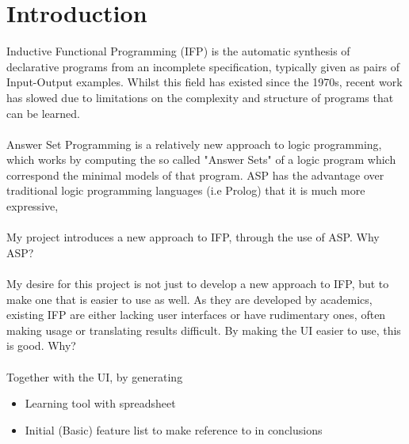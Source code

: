 \chapter{Introduction}

Inductive Functional Programming (IFP) is the automatic synthesis of declarative programs from an incomplete specification, typically given as pairs of Input-Output examples. Whilst this field has existed since the 1970s, recent work has slowed due to limitations on the complexity and structure of programs that can be learned. \\ \\
Answer Set Programming is a relatively new approach to logic programming, which works by computing the so called "Answer Sets" of a logic program which correspond the minimal models of that program. ASP has the advantage over traditional logic programming languages (i.e Prolog) that it is much more expressive,  \\ \\
My project introduces a new approach to IFP, through the use of ASP. Why ASP? \\ \\
My desire for this project is not just to develop a new approach to IFP, but to make one that is easier to use as well. As they are developed by academics, existing IFP are either lacking user interfaces or have rudimentary ones, often making usage or translating results difficult. By making the UI easier to use, this is good. Why? \\ \\
Together with the UI, by generating
\begin{itemize}
\item Learning tool with spreadsheet
\item Initial (Basic) feature list to make reference to in conclusions
\end{itemize}

\pagebreak
%
%